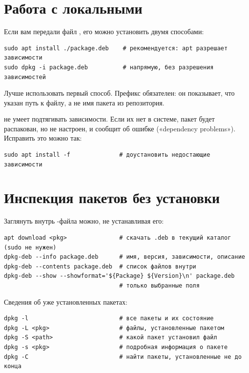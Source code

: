 \section{Работа с локальными }

Если вам передали файл , его можно установить двумя
способами:
\begin{verbatim}
sudo apt install ./package.deb    # рекомендуется: apt разрешает зависимости
sudo dpkg -i package.deb          # напрямую, без разрешения зависимостей
\end{verbatim}

Лучше использовать первый способ. Префикс  обязателен:
он показывает, что указан путь к файлу, а не имя пакета из репозитория.

 не умеет подтягивать зависимости. Если их нет в
системе, пакет будет распакован, но не настроен, и
 сообщит об ошибке («dependency problems»). Исправить это
можно так:
\begin{verbatim}
sudo apt install -f              # доустановить недостающие зависимости
\end{verbatim}

\section{Инспекция пакетов без установки}

Заглянуть внутрь -файла можно, не устанавливая его:

\begin{verbatim}
apt download <pkg>               # скачать .deb в текущий каталог (sudo не нужен)
dpkg-deb --info package.deb      # имя, версия, зависимости, описание
dpkg-deb --contents package.deb  # список файлов внутри
dpkg-deb --show --showformat='${Package} ${Version}\n' package.deb
                                 # только выбранные поля
\end{verbatim}

Сведения об уже установленных пакетах:
\begin{verbatim}
dpkg -l                          # все пакеты и их состояние
dpkg -L <pkg>                    # файлы, установленные пакетом
dpkg -S <path>                   # какой пакет установил файл
dpkg -s <pkg>                    # подробная информация о пакете
dpkg -C                          # найти пакеты, установленные не до конца
\end{verbatim}

